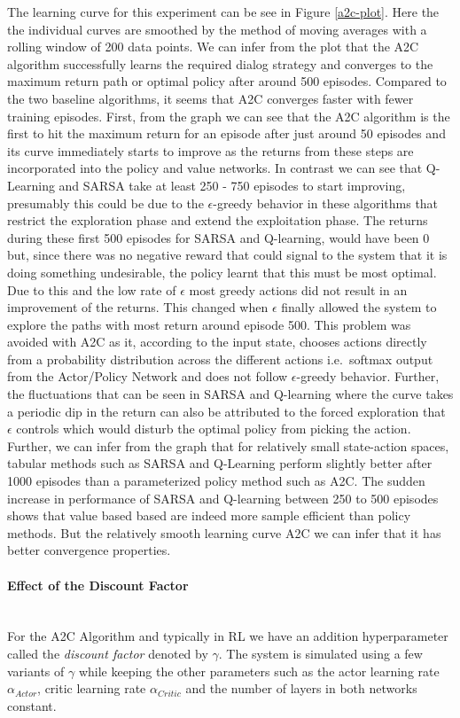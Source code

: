 \documentclass[14pt]{extarticle}
\newcommand{\myparagraph}[1]{\paragraph{#1}\mbox{}\\ \linebreak}
\numberwithin{equation}{section}
\begin{document}
	The learning curve for this experiment can be see in Figure \ref{a2c-plot}. Here the the individual curves are smoothed by the method of moving averages with a rolling window of 200 data points. We can infer from the plot that the A2C algorithm successfully learns the required dialog strategy and converges to the maximum return path or optimal policy after around 500 episodes. Compared to the two baseline algorithms, it seems that A2C converges faster with fewer training episodes. 
	First, from the graph we can see that the A2C algorithm is the first to hit the maximum return for an episode after just around 50 episodes and its curve immediately starts to improve as the returns from these steps are incorporated into the policy and value networks. In contrast we can see that Q-Learning and SARSA take at least 250 - 750 episodes to start improving, presumably this could be due to the $\epsilon$-greedy behavior in these algorithms that restrict the exploration phase and extend the exploitation phase. The returns during these first 500 episodes for SARSA and Q-learning, would have been 0 but, since there was no negative reward that could signal to the system that it is doing something undesirable, the policy learnt that this must be most optimal. Due to this and the low rate of $\epsilon$ most greedy actions did not result in an improvement of the returns. This changed when $\epsilon$ finally allowed the system to explore the paths with most return around episode 500. This problem was avoided with A2C as it, according to the input state, chooses actions directly from a probability distribution across the different actions i.e.\ softmax output from the Actor/Policy Network and does not follow $\epsilon$-greedy behavior. Further, the fluctuations that can be seen in SARSA and Q-learning where the curve takes a periodic dip in the return can also be attributed to the forced exploration that $\epsilon$ controls which would disturb the optimal policy from picking the action. Further, we can infer from the graph that for relatively small state-action spaces, tabular methods such as SARSA and Q-Learning perform slightly better after 1000 episodes than a parameterized policy method such as A2C. The sudden increase in performance of SARSA and Q-learning between 250 to 500 episodes shows that value based based are indeed more sample efficient than policy methods. But the relatively smooth learning curve A2C we can infer that it has better convergence properties.
	\myparagraph{Effect of the Discount Factor}\label{a2c_df_effect}
	For the A2C Algorithm and typically in RL we have an addition hyperparameter called the \textit{discount factor} denoted by $\gamma$. The system is simulated using a few variants of $\gamma$ while keeping the other parameters such as the actor learning rate $\alpha_{Actor}$, critic learning rate $\alpha_{Critic}$ and the number of layers in both networks constant. 
\end{document}
